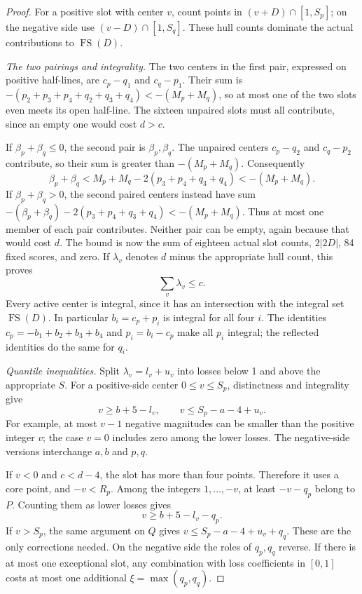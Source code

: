 \documentclass[11pt,a4paper]{article}
\theoremstyle{remark}
\newcommand{\FS}{\operatorname{FS}}
\begin{document}
\begin{proof}
For a positive slot with center $v$, count points in
$(v+D)\cap[1,S_p]$; on the negative side use $(v-D)\cap[1,S_q]$.
These hull counts dominate the actual contributions to $\FS(D)$.

\emph{The two pairings and integrality.}
The two centers in the first pair, expressed on positive half-lines, are
$c_p-q_1$ and $c_q-p_1$. Their sum is
$-(p_2+p_3+p_4+q_2+q_3+q_4)<-(M_p+M_q)$, so at most one of the two
slots even meets its open half-line. The sixteen unpaired slots must all
contribute, since an empty one would cost $d>c$.

If $\beta_p+\beta_q\leq0$, the second pair is $\beta_p,\beta_q$.
The unpaired centers $c_p-q_2$ and $c_q-p_2$ contribute, so their sum is
greater than $-(M_p+M_q)$. Consequently
\[
 \beta_p+\beta_q
 <M_p+M_q-2(p_3+p_4+q_3+q_4)<-(M_p+M_q).
\]
If $\beta_p+\beta_q>0$, the second paired centers instead have sum
$-(\beta_p+\beta_q)-2(p_3+p_4+q_3+q_4)<-(M_p+M_q)$.
Thus at most one member of each pair contributes. Neither pair can be
empty, again because that would cost $d$. The bound is now the sum of
eighteen actual slot counts, $2|2D|$, 84 fixed scores, and zero.
If $\lambda_v$ denotes $d$ minus the appropriate hull count, this proves
\begin{equation}
 \sum_v\lambda_v\leq c.\label{u96:eq:loss-sum}
\end{equation}
Every active center is integral, since it has an intersection with the
integral set $\FS(D)$. In particular $b_i=c_p+p_i$ is integral for all four
$i$. The identities $c_p=-b_1+b_2+b_3+b_4$ and $p_i=b_i-c_p$ make all
$p_i$ integral; the reflected identities do the same for $q_i$.

\emph{Quantile inequalities.}
Split $\lambda_v=l_v+u_v$ into losses below 1 and above the appropriate
$S$. For a positive-side center $0\leq v\leq S_p$, distinctness and
integrality give
\begin{equation}
 v\geq b+5-l_v,\qquad
 v\leq S_p-a-4+u_v.\label{u96:eq:quantile}
\end{equation}
For example, at most $v-1$ negative magnitudes can be smaller than the
positive integer $v$; the case $v=0$ includes zero among the lower losses.
The negative-side versions interchange $a,b$ and $p,q$.

If $v<0$ and $c<d-4$, the slot has more than four points. Therefore it
uses a core point, and $-v<R_p$. Among the integers $1,\ldots,-v$, at
least $-v-q_p$ belong to $P$. Counting them as lower losses gives
\[
 v\geq b+5-l_v-q_p.
\]
If $v>S_p$, the same argument on $Q$ gives
$v\leq S_p-a-4+u_v+q_q$. These are the only corrections needed. On the
negative side the roles of $q_p,q_q$ reverse. If there is at most one
exceptional slot, any combination with loss coefficients in $[0,1]$ costs
at most one additional $\xi=\max(q_p,q_q)$.


\end{proof}
\end{document}
